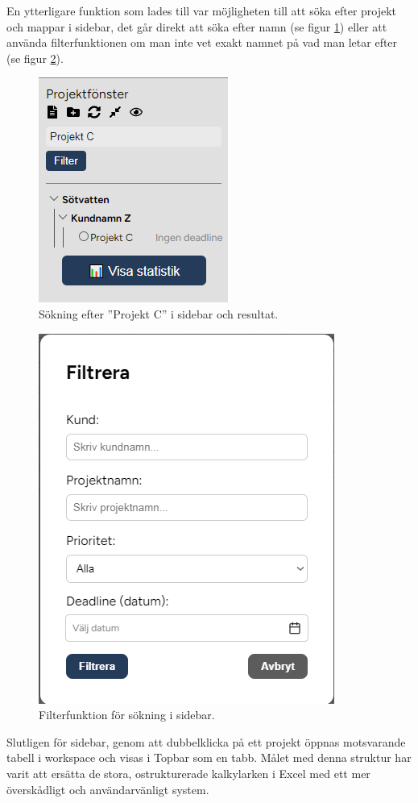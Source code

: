 \noindent En ytterligare funktion som lades till var möjligheten till att söka efter projekt och mappar i sidebar, det går direkt att söka efter namn (se figur \ref{fig:sidebar_sok}) eller att använda filterfunktionen om man inte vet exakt namnet på vad man letar efter (se figur \ref{fig:sidebar_filter}).
\begin{figure}[H]  
\centering
    \includegraphics[width=0.5\linewidth]{images/sidebar_sok.PNG}
    \caption{Sökning efter ''Projekt C'' i sidebar och resultat.}
    \label{fig:sidebar_sok}
\end{figure}
\begin{figure}[H]  
\centering
    \includegraphics[width=0.5\linewidth]{images/sidebar_filter.PNG}
    \caption{Filterfunktion för sökning i sidebar.}
    \label{fig:sidebar_filter}
\end{figure}

\noindent Slutligen för sidebar, genom att dubbelklicka på ett projekt öppnas motsvarande tabell i workspace och visas i Topbar som en tabb.
Målet med denna struktur har varit att ersätta de stora, ostrukturerade kalkylarken i Excel med ett mer överskådligt och användarvänligt system.

